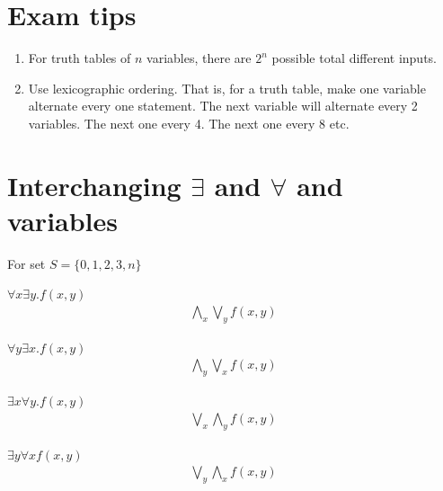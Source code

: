 \documentclass[a4paper]{article}
\theoremstyle{plain}
\theoremstyle{definition}
\newtheorem{exmp}{Example}[section]
\theoremstyle{remark}
\begin{document}
\section{Exam tips}
\begin{enumerate} 
	\item For truth tables of $n$ variables, there are $2^{n}$ possible total different inputs.
	\item Use lexicographic ordering. That is, for a truth table, make one variable alternate every one statement. The next variable will alternate every 2 variables. The next one every 4. The next one every 8 etc.  	
\end{enumerate}
\newpage 
\appendix
\section{Interchanging $\exists $ and $\forall $ and variables}
For set $S = \{0,1,2,3,n\}$
\begin{tcolorbox}[colback=black!3!white,colframe=black!60!white,title=\begin{exmp}Example 1 \label{Example 1}\end{exmp}]
$\forall x \exists y . f(x,y)$
\begin{align}
	\bigwedge_x \bigvee_y f(x,y)
\end{align}
\end{tcolorbox} 
\begin{tcolorbox}[colback=black!3!white,colframe=black!60!white,title=\begin{exmp}Example 2 \label{Example 2}\end{exmp}] 
$\forall y \exists x.f(x,y)$ \begin{align} \bigwedge_y \bigvee_x f(x,y)
\end{align}
	\end{tcolorbox}
	\begin{tcolorbox}[colback=black!3!white,colframe=black!60!white,title=\begin{exmp}Example 3 \label{Example 3}\end{exmp}]
	$\exists x \forall y . f(x,y)$ \begin{align} \bigvee_x \bigwedge_y f(x,y)	
		\end{align} 
		\end{tcolorbox}
		\begin{tcolorbox}[colback=black!3!white,colframe=black!60!white,title=\begin{exmp}Example 4 \label{Example 4}\end{exmp}]
		$\exists y\forall x f(x,y)$ \begin{align} \bigvee_y \bigwedge_x f(x,y) \end{align}
		\end{tcolorbox}
		
\end{document}

